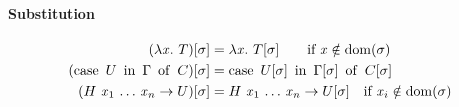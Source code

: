 \documentclass{llncs}
\begin{document}
\paragraph{Substitution}

\begin{align*}
  {(\lambda{\ensuremath{\text{\textit{x}}}}.\ T)}[{\sigma}] &= \lambda{\ensuremath{\text{\textit{x}}}}.\  {{T}[{\sigma}]} \qquad
  \text{if $\text{\textit{x}}\notin\operatorname{dom}{\!(\sigma)}$}\\
  {(\operatorname{case}\ {{U}\ \operatorname{in}\ {\Gamma}}\ \operatorname{of}\  C)}[{\sigma}] &=
  \operatorname{case}\ {{{U}[{\sigma}]}\ \operatorname{in}\ {{\Gamma}[{\sigma}]}}\ \operatorname{of}\  {{C}[{\sigma}]} \\
  {({{H}\  {{\text{\textit{x}}_1}\ {{\ldots}\ {\text{\textit{x}}_n}}}}\to U)}[{\sigma}] &= {{{H}\  {{\text{\textit{x}}_1}\ {{\ldots}\ {\text{\textit{x}}_n}}}}\to {U}[{\sigma}]} \quad \text{if $\text{\textit{x}}_i\notin\operatorname{dom}{\!(\sigma)}$} \\
\end{align*}
\end{document}
